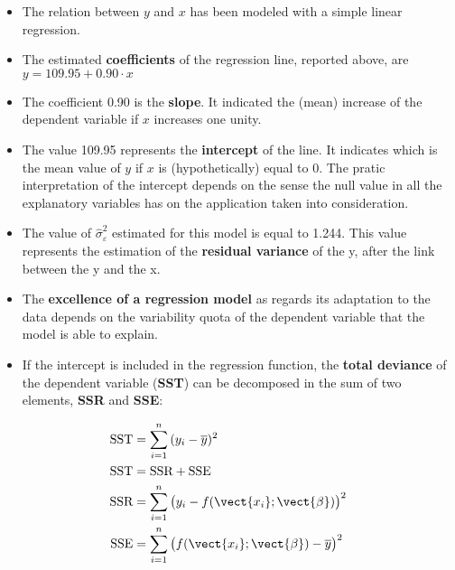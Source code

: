 \begin{frame}
  \vspace*{.25cm}  
  \begin{itemize}
    \item The relation between $ y $ and $ x $ has been modeled with a simple linear regression.
    \item The estimated \textbf{coefficients} of the regression line, reported above, are $y=109.95 + 0.90 \cdot x$
    \item The coefficient 0.90 is the \textbf{slope}. It indicated the (mean) increase of the dependent variable if $x$ increases one unity.
    \item The value 109.95 represents the \textbf{intercept} of the line. It indicates which is the mean value of  $y$ if $x$ is (hypothetically) equal to 0. The pratic interpretation of the intercept depends on the sense the null value in all the explanatory variables has on the application taken into consideration.
   \item  The value of $ \hat{\sigma}^2_{\varepsilon} $ estimated for this model is equal to 1.244. This value represents the estimation of the \textbf{residual variance} of the y, after the link between the y and the x.
  \end{itemize}
\end{frame}





\begin{frame}
  \begin{itemize}
    \item The \textbf{excellence of a regression model} as regards its adaptation to the data depends on the variability quota of the dependent variable that the model is able to explain.
    \item If the intercept is included in the regression function, the \textbf{total deviance} of the dependent variable (\textbf{SST}) can be decomposed in the sum of two elements, \textbf{SSR} and \textbf{SSE}:
  \end{itemize}
  \begin{align*}
    \text{SST} &= \sum_{i=1}^n {(y_i - \overline{y})^2} \\
    \text{SST} &= \text{SSR} + \text{SSE} \\
    \text{SSR} &= \sum_{i=1}^n {\bigl(y_i-f( \vect{x_i}; \vect{\beta} ) \bigr)^2} \\
    \text{SSE} &= \sum_{i=1}^n {\bigl(f( \vect{x_i}; \vect{\beta} ) - \overline{y} \bigr)^2} \\
  \end{align*}
\end{frame}

